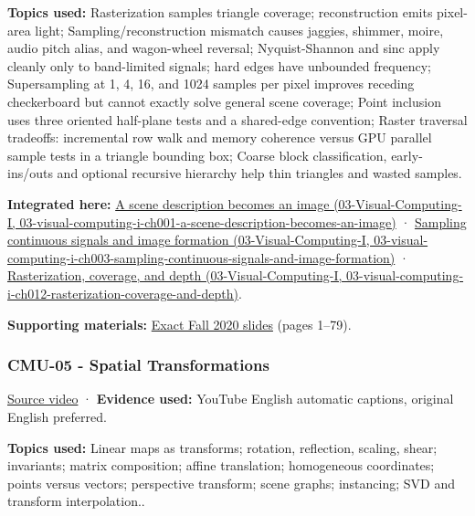 \textbf{Topics used:} Rasterization samples triangle coverage; reconstruction emits pixel-area light; Sampling/reconstruction mismatch causes jaggies, shimmer, moire, audio pitch alias, and wagon-wheel reversal; Nyquist-Shannon and sinc apply cleanly only to band-limited signals; hard edges have unbounded frequency; Supersampling at 1, 4, 16, and 1024 samples per pixel improves receding checkerboard but cannot exactly solve general scene coverage; Point inclusion uses three oriented half-plane tests and a shared-edge convention; Raster traversal tradeoffs: incremental row walk and memory coherence versus GPU parallel sample tests in a triangle bounding box; Coarse block classification, early-ins/outs and optional recursive hierarchy help thin triangles and wasted samples.

\textbf{Integrated here:} \href{../03-Visual-Computing-I/main.pdf\#nameddest=03-visual-computing-i-ch001-a-scene-description-becomes-an-image}{A scene description becomes an image (03-Visual-Computing-I, 03-visual-computing-i-ch001-a-scene-description-becomes-an-image)} · \href{../03-Visual-Computing-I/main.pdf\#nameddest=03-visual-computing-i-ch003-sampling-continuous-signals-and-image-formation}{Sampling continuous signals and image formation (03-Visual-Computing-I, 03-visual-computing-i-ch003-sampling-continuous-signals-and-image-formation)} · \href{../03-Visual-Computing-I/main.pdf\#nameddest=03-visual-computing-i-ch012-rasterization-coverage-and-depth}{Rasterization, coverage, and depth (03-Visual-Computing-I, 03-visual-computing-i-ch012-rasterization-coverage-and-depth)}.

\textbf{Supporting materials:} \href{https://15462.courses.cs.cmu.edu/fall2020content/lectures/04_drawingatriangle/04_drawingatriangle_slides.pdf}{Exact Fall 2020 slides} (pages 1--79).

\subsubsection{CMU-05 - Spatial Transformations}\label{04-visual-computing-ii-ch036-cmu-05---spatial-transformations}

\href{https://www.youtube.com/watch?v=QmFBHSJS0Gw}{Source video} · \textbf{Evidence used:} YouTube English automatic captions, original English preferred.

\textbf{Topics used:} Linear maps as transforms; rotation, reflection, scaling, shear; invariants; matrix composition; affine translation; homogeneous coordinates; points versus vectors; perspective transform; scene graphs; instancing; SVD and transform interpolation..

